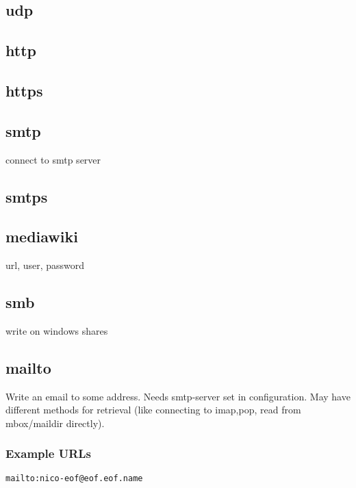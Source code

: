 \documentclass[12pt,a4paper]{book}
\begin{document}
{\subsection{udp}
\subsection{http}
\subsection{https}
\subsection{smtp}
connect to smtp server
\subsection{smtps}
\subsection{mediawiki}
url, user, password
\subsection{smb}
write on windows shares
\subsection{mailto}
Write an email to some address. Needs smtp-server set in configuration.
May have different methods for retrieval (like connecting to imap,pop,
read from mbox/maildir directly).
\subsubsection{Example URLs}
\begin{verbatim}
mailto:nico-eof@eof.eof.name
\end{verbatim}
}
\end{document}
